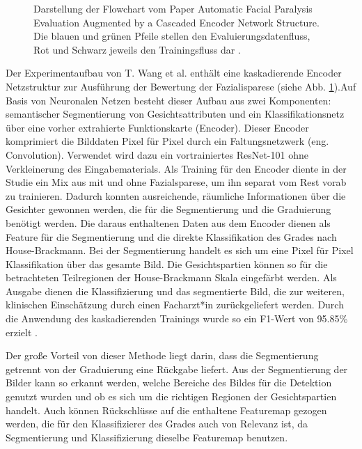 \begin{figure}[!b]
{
}%
\caption[Darstellung der Flowchart vom Paper Automatic Facial Paralysis Evaluation Augmented by a Cascaded Encoder Network Structure]{Darstellung der Flowchart vom Paper Automatic Facial Paralysis Evaluation Augmented by a Cascaded Encoder Network Structure. Die blauen und grünen Pfeile stellen den Evaluierungsdatenfluss, Rot und Schwarz jeweils den Trainingsfluss dar \cite{detection_fp2}.}\label{cap:paper_1}
\end{figure}\label{fig:paper_1}

Der Experimentaufbau von T. Wang et al. enthält eine kaskadierende Encoder Netzstruktur zur Ausführung der Bewertung der Fazialisparese (siehe Abb. \ref{cap:paper_1}).Auf Basis von Neuronalen Netzen besteht dieser Aufbau aus zwei Komponenten: semantischer Segmentierung von Gesichtsattributen und ein Klassifikationsnetz über eine vorher extrahierte Funktionskarte (Encoder). Dieser Encoder komprimiert die Bilddaten Pixel für Pixel durch ein Faltungsnetzwerk (eng. Convolution). Verwendet wird dazu ein vortrainiertes ResNet-101 ohne Verkleinerung des Eingabematerials. Als Training für den Encoder diente in der Studie ein Mix aus mit und ohne Fazialsparese, um ihn separat vom Rest vorab zu trainieren. Dadurch konnten ausreichende, räumliche Informationen über die Gesichter gewonnen werden, die für die Segmentierung und die Graduierung benötigt werden. Die daraus enthaltenen Daten aus dem Encoder dienen als Feature für die Segmentierung und die direkte Klassifikation des Grades nach House-Brackmann. Bei der Segmentierung handelt es sich um eine Pixel für Pixel Klassifikation über das gesamte Bild. Die Gesichtspartien können so für die betrachteten Teilregionen der House-Brackmann Skala eingefärbt werden. Als Ausgabe dienen die Klassifizierung und das segmentierte Bild, die zur weiteren, klinischen Einschätzung durch einen Facharzt*in zurückgeliefert werden. Durch die Anwendung des kaskadierenden Trainings wurde so ein F1-Wert von 95.85\% erzielt \cite{detection_fp2}.

Der große Vorteil von dieser Methode liegt darin, dass die Segmentierung getrennt von der Graduierung eine Rückgabe liefert. Aus der Segmentierung der Bilder kann so erkannt werden, welche Bereiche des Bildes für die Detektion genutzt wurden und ob es sich um die richtigen Regionen der Gesichtspartien handelt. Auch können Rückschlüsse auf die enthaltene Featuremap gezogen werden, die für den Klassifizierer des Grades auch von Relevanz ist, da Segmentierung und Klassifizierung dieselbe Featuremap benutzen.



